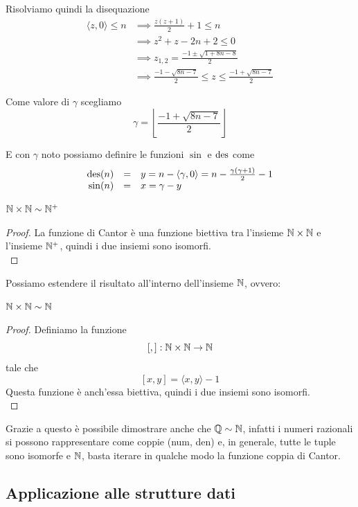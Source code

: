 Risolviamo quindi la disequazione
\begin{align*}
	\langle z, 0 \rangle \leq n & \implies \frac{z(z+1)}{2} + 1 \leq n \\
	& \implies z^2 + z - 2n + 2 \leq 0 \\
	& \implies z_{1,2} = \frac{-1 \pm \sqrt{1 + 8n - 8}}{2} \\
	& \implies \frac{-1 - \sqrt{8n - 7}}{2} \leq z \leq \frac{-1 + \sqrt{8n - 7}}{2} 
\end{align*}

Come valore di $\gamma$ scegliamo
$$ \gamma = \left\lfloor \frac{-1 + \sqrt{8n - 7}}{2} \right\rfloor $$

E con $\gamma$ noto possiamo definire le funzioni $\sin$ e $\operatorname{des}$ come
$$ 
\begin{array}{r c l}
	\operatorname{des}(n) & = & y = n - \langle \gamma, 0 \rangle = n - \frac{\gamma (\gamma + 1)}{2} - 1 \\
	\sin (n) & = & x = \gamma - y
\end{array}
$$

\begin{theor}
	$\mathbb{N} \times \mathbb{N} \sim \mathbb{N}^+$
\end{theor}
\begin{proof}
	La funzione di Cantor è una funzione biettiva tra l'insieme $\mathbb{N} \times \mathbb{N}$ e l'insieme $\mathbb{N}^+$, quindi i due insiemi sono isomorfi.\\
\end{proof}

Possiamo estendere il risultato all'interno dell'insieme $\mathbb{N}$, ovvero:

\begin{theor}
	$\mathbb{N} \times \mathbb{N} \sim \mathbb{N}$
\end{theor}
\begin{proof}
	Definiamo la funzione 
	$$ [,]: \mathbb{N} \times \mathbb{N} \rightarrow \mathbb{N} $$
	tale che
	$$ [x,y] = \langle x,y \rangle - 1$$
	Questa funzione è anch'essa biettiva, quindi i due insiemi sono isomorfi.\\
\end{proof}

Grazie a questo è possibile dimostrare anche che $\mathbb{Q} \sim \mathbb{N}$, infatti i numeri razionali si possono rappresentare come coppie (num, den) e, in generale, tutte le tuple sono isomorfe e $\mathbb{N}$, basta iterare in qualche modo la funzione coppia di Cantor.\\

\subsection{Applicazione alle strutture dati}

